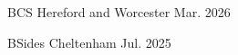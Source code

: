 


\begin{cvhonors}


\cvhonor
{BCS Hereford and Worcester} %
{} %
{} %
{Mar. 2026} %

\cvhonor
{BSides Cheltenham} %
{} %
{} %
{Jul. 2025} %

\end{cvhonors}
